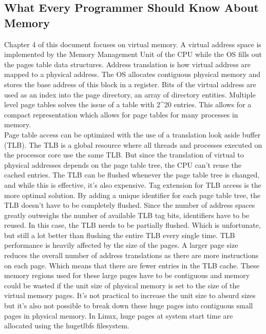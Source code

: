 \documentclass[letterpaper,10pt,titlepage]{article}
\begin{document}
\subsection*{What Every Programmer Should Know About Memory}
Chapter 4 of this document focuses on virtual memory. A virtual address space is implemented by the Memory Management Unit of the CPU while the OS fills out the pages table data structures. Address translation is how virtual address are mapped to a physical address. The OS allocates contiguous physical memory and stores the base address of this block in a register. Bits of the virtual address are used as an index into the page directory, an array of directory entities. Multiple level page tables solves the issue of a table with 2\^{}20 entries. This allows for a compact representation which allows for page tables for many processes in memory. \\

\noindent Page table access can be optimized with the use of a translation look aside buffer (TLB). The TLB is a global resource where all threads and processes executed on the processor core use the same TLB. But since the translation of virtual to physical addresses depends on the page table tree, the CPU can't reuse the cached entries. The TLB can be flushed whenever the page table tree is changed, and while this is effective, it's also expensive. Tag extension for TLB access is the more optimal solution. By adding a unique identifier for each page table tree, the TLB doesn't have to be completely flushed. Since the number of address spaces greatly outweighs the number of available TLB tag bits, identifiers have to be reused. In this case, the TLB needs to be partially flushed. Which is unfortunate, but still a lot better than flushing the entire TLB every single time. TLB performance is heavily affected by the size of the pages. A larger page size reduces the overall number of address translations as there are more instructions on each page. Which means that there are fewer entries in the TLB cache. These memory regions used for these large pages have to be contiguous  and memory could be wasted if the unit size of physical memory is set to the size of the virtual memory pages. It's not practical to increase the unit size to absurd sizes but it's also not possible to break down these huge pages into contiguous small pages in physical memory. In Linux, huge pages at system start time are allocated using the hugetlbfs filesystem. \\

\pagebreak




\end{document}
